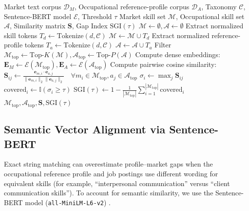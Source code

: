 \documentclass[journal]{IEEEtran}
\begin{document}
\begin{algorithm}[!htbp]
\caption{Semantic Skill Extraction and Embedding Alignment}
\label{alg:skill_extract}
\begin{algorithmic}[1]
\REQUIRE Market text corpus $\mathcal{D}_M$, Occupational reference-profile corpus $\mathcal{D}_A$, Taxonomy $\mathcal{C}$, Sentence-BERT model $\mathcal{E}$, Threshold $\tau$
\ENSURE Market skill set $\mathcal{M}$, Occupational skill set $\mathcal{A}$, Similarity matrix $\mathbf{S}$, Gap Index $\text{SGI}(\tau)$
\STATE $\mathcal{M} \leftarrow \emptyset, \mathcal{A} \leftarrow \emptyset$
    \STATE Extract normalized skill tokens $T_d \leftarrow \text{Tokenize}(d, \mathcal{C})$
    \STATE $\mathcal{M} \leftarrow \mathcal{M} \cup T_d$
\ENDFOR
{}
    \STATE Extract normalized reference-profile tokens $T_a \leftarrow \text{Tokenize}(d, \mathcal{C})$
    \STATE $\mathcal{A} \leftarrow \mathcal{A} \cup T_a$
\ENDFOR
\STATE Filter $\mathcal{M}_{\text{top}} \leftarrow \text{Top-}K(\mathcal{M}), \mathcal{A}_{\text{top}} \leftarrow \text{Top-}P(\mathcal{A})$  
\STATE Compute dense embeddings: $\mathbf{E}_M \leftarrow \mathcal{E}(\mathcal{M}_{\text{top}}), \mathbf{E}_A \leftarrow \mathcal{E}(\mathcal{A}_{\text{top}})$
\STATE Compute pairwise cosine similarity:
\STATE $\mathbf{S}_{ij} \leftarrow \frac{\mathbf{e}_{m,i} \cdot \mathbf{e}_{a,j}}{\|\mathbf{e}_{m,i}\|_2 \|\mathbf{e}_{a,j}\|_2} \quad \forall m_i \in \mathcal{M}_{\text{top}}, a_j \in \mathcal{A}_{\text{top}}$
    \STATE $\sigma_i \leftarrow \max_j \mathbf{S}_{ij}$
    \STATE $\text{covered}_i \leftarrow \mathbb{I}(\sigma_i \ge \tau)$
\ENDFOR
\STATE $\text{SGI}(\tau) \leftarrow 1 - \frac{1}{|\mathcal{M}_{\text{top}}|} \sum_{i=1}^{|\mathcal{M}_{\text{top}}|} \text{covered}_i$
\RETURN $\mathcal{M}_{\text{top}}, \mathcal{A}_{\text{top}}, \mathbf{S}, \text{SGI}(\tau)$
\end{algorithmic}
\end{algorithm}

\subsection{Semantic Vector Alignment via Sentence-BERT}

Exact string matching can overestimate profile--market gaps when the occupational reference profile and job postings use different wording for equivalent skills (for example, ``interpersonal communication'' versus ``client communication skills''). To account for semantic similarity, we use the Sentence-BERT model (\texttt{all-MiniLM-L6-v2}) \cite{reimers2019sentence}.
\end{document}
